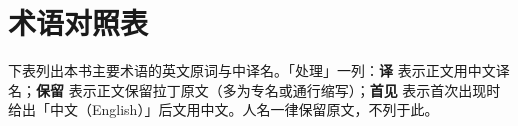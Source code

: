 \chapter*{术语对照表}
\noindent 下表列出本书主要术语的英文原词与中译名。「处理」一列：\textbf{译} 表示正文用中文译名；\textbf{保留} 表示正文保留拉丁原文（多为专名或通行缩写）；\textbf{首见} 表示首次出现时给出「中文（English）」后文用中文。人名一律保留原文，不列于此。\par
\medskip

\newcommand{\termrowA}[2]{\par\noindent\interlinepenalty=10000\hangindent=1.1em\hangafter=1 \textbf{#1}\quad #2\par}
\newcommand{\termrowB}[3]{\par\noindent\interlinepenalty=10000\hangindent=1.1em\hangafter=1 \textbf{#1}\quad #2\par\nobreak\hspace*{1.1em}{\small\color{black!65}\interlinepenalty=10000 #3\par}}
\newcommand{\termgroup}[1]{\par\medskip\noindent{\bfseries\large #1}\par\medskip}

